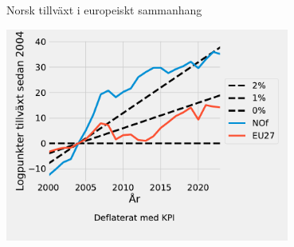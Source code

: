 \documentclass{beamer}
\begin{document}
\begin{frame}{Norsk tillväxt i europeiskt sammanhang}
    \label{europe_cpi}
    \begin{center}
        \includegraphics[width=0.7\textwidth]{figures/GDP_growth1_Europe_Norway.pdf}
    \end{center}
    \hyperlink{europe_gdp}{}
\end{frame}
\end{document}
